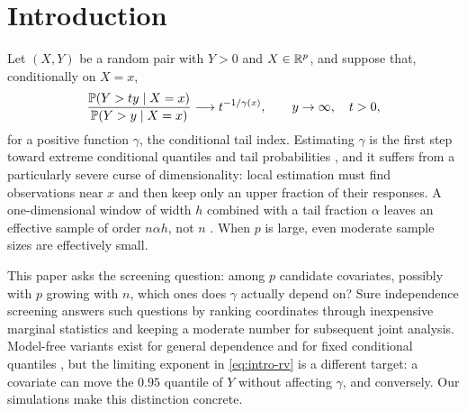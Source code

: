 \documentclass[bj,authoryear]{imsart}
\theoremstyle{plain}
\begin{document}
\begin{frontmatter}
\begin{keyword}
\end{keyword}

\end{frontmatter}

\section{Introduction}\label{sec:intro}

Let $(X,Y)$ be a random pair with $Y>0$ and $X\in\mathbb R^p$, and suppose that,
conditionally on $X=x$,
\begin{equation}\label{eq:intro-rv}
 \frac{\mathbb P(Y>ty\mid X=x)}{\mathbb P(Y>y\mid X=x)}
 \longrightarrow t^{-1/\gamma(x)},\qquad y\to\infty,\quad t>0,
\end{equation}
for a positive function $\gamma$, the conditional tail index. Estimating
$\gamma$ is the first step toward extreme conditional quantiles and tail
probabilities \citep{deHaanFerreira2006,hill1975}, and it suffers from a
particularly severe curse of dimensionality: local estimation must find
observations near $x$ and then keep only an upper fraction of their
responses. A one-dimensional window of width $h$ combined with a tail
fraction $\alpha$ leaves an effective sample of order $n\alpha h$, not $n$
\citep{daouiaEtAl2013,gardesStupfler2014}. When $p$ is large, even moderate
sample sizes are effectively small.

This paper asks the screening question: among $p$ candidate covariates,
possibly with $p$ growing with $n$, which ones does $\gamma$ actually depend
on? Sure independence screening \citep{fanLv2008} answers such questions by
ranking coordinates through inexpensive marginal statistics and keeping a
moderate number for subsequent joint analysis. Model-free variants exist for
general dependence \citep{liZhongZhu2012} and for fixed conditional quantiles
\citep{heWangHong2013}, but the limiting exponent in \eqref{eq:intro-rv} is a
different target: a covariate can move the $0.95$ quantile of $Y$ without
affecting $\gamma$, and conversely. Our simulations make this distinction
concrete.
\end{document}
